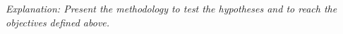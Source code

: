 %

\emph{Explanation: Present the methodology to test the hypotheses and to reach
the objectives defined above.} 





% 
